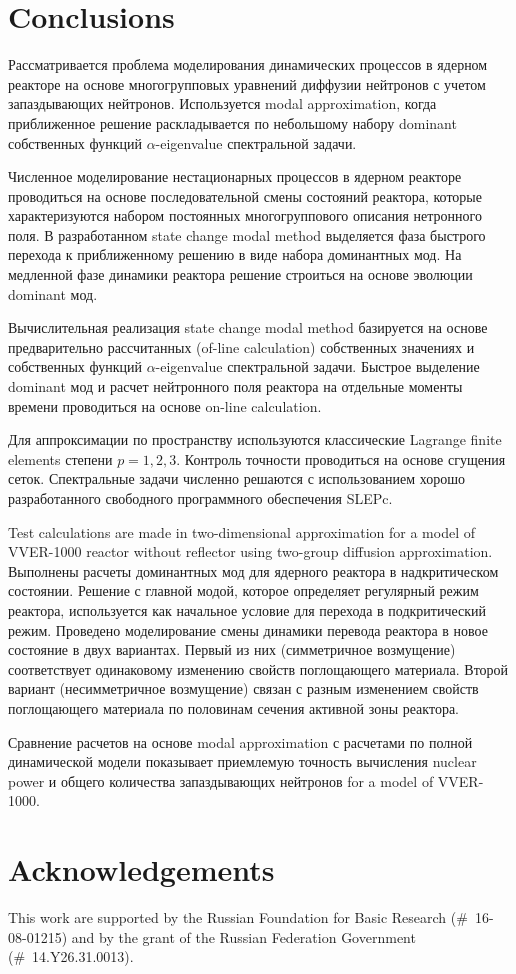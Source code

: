\documentclass[authoryear]{elsarticle}
\begin{document}
\section{Conclusions} 

Рассматривается проблема моделирования динамических процессов в ядерном реакторе на основе
многогрупповых уравнений диффузии нейтронов с учетом запаздывающих нейтронов.
Используется modal approximation, когда приближенное решение раскладывается
по небольшому набору dominant собственных функций  $\alpha$-eigenvalue спектральной задачи.

Численное моделирование нестационарных
процессов в ядерном реакторе проводиться на основе последовательной смены состояний 
реактора, которые характеризуются набором постоянных многогруппового описания нетронного поля.
В разработанном state change modal method выделяется
фаза быстрого перехода к приближенному решению в виде набора доминантных мод.
На медленной фазе динамики реактора решение строиться на основе эволюции
dominant мод.

Вычислительная реализация state change modal method базируется на основе
предварительно рассчитанных (of-line calculation) собственных значениях 
и собственных функций  $\alpha$-eigenvalue спектральной задачи.
Быстрое выделение dominant мод и расчет нейтронного поля реактора на отдельные моменты времени
проводиться на основе on-line calculation.

Для аппроксимации по пространству используются классические  Lagrange finite elements степени  $p=1,2,3$. 
Контроль точности проводиться на основе сгущения сеток. 
Спектральные задачи численно решаются с использованием хорошо разработанного свободного
программного обеспечения SLEPc.

Test calculations are made in two-dimensional approximation for a model of VVER-1000 reactor without reflector 
using two-group diffusion approximation. Выполнены расчеты доминантных мод 
для ядерного реактора в надкритическом состоянии. 
Решение с главной модой, которое определяет регулярный режим реактора, используется 
как начальное условие для перехода в подкритический режим. 
Проведено моделирование смены динамики перевода реактора в новое состояние
в двух вариантах. Первый из них (симметричное возмущение) соответствует 
одинаковому изменению свойств поглощающего материала.
Второй вариант  (несимметричное возмущение) связан с разным изменением свойств поглощающего материала
по половинам сечения активной зоны реактора.

Сравнение расчетов на основе modal approximation с расчетами по полной динамической модели
показывает приемлемую точность вычисления nuclear power и общего
количества запаздывающих нейтронов for a model of VVER-1000.

\section*{Acknowledgements}

This work are supported by the Russian Foundation for Basic Research (\#~16-08-01215) 
and by the grant of the Russian Federation Government (\#~14.Y26.31.0013).

\clearpage


\end{document}
